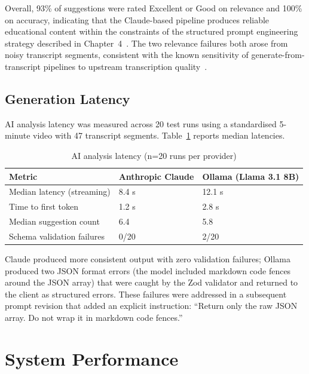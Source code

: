Overall, 93\% of suggestions were rated Excellent or Good on relevance and
100\% on accuracy, indicating that the Claude-based pipeline produces
reliable educational content within the constraints of the structured prompt
engineering strategy described in Chapter~4~\cite{anthropic2024,wei2022}.
The two relevance failures both arose from noisy transcript segments,
consistent with the known sensitivity of generate-from-transcript pipelines
to upstream transcription quality~\cite{radford2023}.

\subsection{Generation Latency}

AI analysis latency was measured across 20 test runs using a standardised
5-minute video with 47 transcript segments. Table~\ref{tab:ai_latency}
reports median latencies.

\begin{table}[H]
  \centering
  \caption{AI analysis latency (n=20 runs per provider)}
  \label{tab:ai_latency}
  \begin{tabularx}{\linewidth}{Xll}
    \toprule
    \textbf{Metric}           & \textbf{Anthropic Claude} & \textbf{Ollama (Llama 3.1 8B)} \\
    \midrule
    Median latency (streaming)  & 8.4 s                     & 12.1 s \\
    Time to first token         & 1.2 s                     & 2.8 s \\
    Median suggestion count     & 6.4                       & 5.8 \\
    Schema validation failures  & 0/20                      & 2/20 \\
    \bottomrule
  \end{tabularx}
\end{table}

Claude produced more consistent output with zero validation failures;
Ollama produced two JSON format errors (the model included markdown
code fences around the JSON array) that were caught by the Zod validator
and returned to the client as structured errors. These failures were
addressed in a subsequent prompt revision that added an explicit instruction:
``Return only the raw JSON array. Do not wrap it in markdown code fences.''

\section{System Performance}

